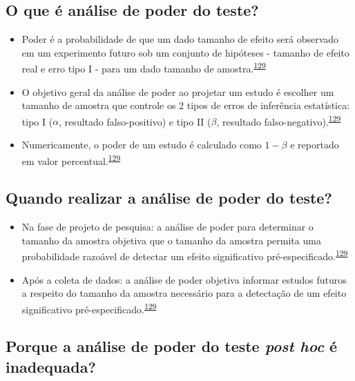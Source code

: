 \documentclass[
  a4paper,
]{book}
\begin{document}
\hypertarget{o-que-uxe9-anuxe1lise-de-poder-do-teste}{%
\subsection{O que é análise de poder do teste?}\label{o-que-uxe9-anuxe1lise-de-poder-do-teste}}

\begin{itemize}
\item
  Poder é a probabilidade de que um dado tamanho de efeito será observado em um experimento futuro sob um conjunto de hipóteses - tamanho de efeito real e erro tipo I - para um dado tamanho de amostra.\textsuperscript{\protect\hyperlink{ref-heckman2022}{129}}
\item
  O objetivo geral da análise de poder ao projetar um estudo é escolher um tamanho de amostra que controle os 2 tipos de erros de inferência estatística: tipo I (\(\alpha\), resultado falso-positivo) e tipo II (\(\beta\), resultado falso-negativo).\textsuperscript{\protect\hyperlink{ref-heckman2022}{129}}
\item
  Numericamente, o poder de um estudo é calculado como \(1-\beta\) e reportado em valor percentual.\textsuperscript{\protect\hyperlink{ref-heckman2022}{129}}
\end{itemize}

\hypertarget{quando-realizar-a-anuxe1lise-de-poder-do-teste}{%
\subsection{Quando realizar a análise de poder do teste?}\label{quando-realizar-a-anuxe1lise-de-poder-do-teste}}

\begin{itemize}
\item
  Na fase de projeto de pesquisa: a análise de poder para determinar o tamanho da amostra objetiva que o tamanho da amostra permita uma probabilidade razoável de detectar um efeito significativo pré-especificado.\textsuperscript{\protect\hyperlink{ref-heckman2022}{129}}
\item
  Após a coleta de dados: a análise de poder objetiva informar estudos futuros a respeito do tamanho da amostra necessário para a detectação de um efeito significativo pré-especificado.\textsuperscript{\protect\hyperlink{ref-heckman2022}{129}}
\end{itemize}

\hypertarget{porque-a-anuxe1lise-de-poder-do-teste-post-hoc-uxe9-inadequada}{%
\subsection{\texorpdfstring{Porque a análise de poder do teste \emph{post hoc} é inadequada?}{Porque a análise de poder do teste post hoc é inadequada?}}\label{porque-a-anuxe1lise-de-poder-do-teste-post-hoc-uxe9-inadequada}}
\end{document}
